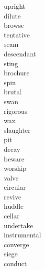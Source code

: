 \documentclass[a4paper, 11pt]{ctexart}
\begin{document}
\begin{multicols*}{3}
\begin{description}
\item[upright]

\item[dilute]

\item[browse]

\item[tentative]

\item[seam]

\item[descendant]

\item[sting]

\item[brochure]

\item[spin]

\item[brutal]

\item[swan]

\item[rigorous]

\item[wax]

\item[slaughter]

\item[pit]

\item[decay]

\item[beware]

\item[worship]

\item[valve]

\item[circular]

\item[revive]

\item[huddle]

\item[cellar]

\item[undertake]

\item[instrumental]

\item[converge]

\item[siege]

\item[conduct]


\end{description}
\end{multicols*}
\end{document}
